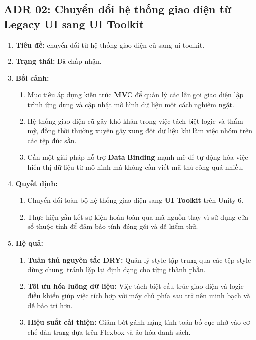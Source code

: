 \subsection{ADR 02: Chuyển đổi hệ thống giao diện từ Legacy UI sang UI Toolkit} \label{adr:02}

\begin{enumerate}
	\item \textbf{Tiêu đề:} chuyển đổi từ hệ thống giao diện cũ sang ui toolkit.
	\item \textbf{Trạng thái:} Đã chấp nhận.
	\item \textbf{Bối cảnh:}
	\begin{enumerate}
		\item Mục tiêu áp dụng kiến trúc \textbf{MVC} để quản lý các lần gọi giao diện lập trình ứng dụng và cập nhật mô hình dữ liệu một cách nghiêm ngặt.
		\item Hệ thống giao diện cũ gây khó khăn trong việc tách biệt logic và thẩm mỹ, đồng thời thường xuyên gây xung đột dữ liệu khi làm việc nhóm trên các tệp đúc sẵn.
		\item Cần một giải pháp hỗ trợ \textbf{Data Binding} mạnh mẽ để tự động hóa việc hiển thị dữ liệu từ mô hình mà không cần viết mã thủ công quá nhiều.
	\end{enumerate}
	\item \textbf{Quyết định:}
	\begin{enumerate}
		\item Chuyển đổi toàn bộ hệ thống giao diện sang \textbf{UI Toolkit} trên Unity 6.
		\item Thực hiện gắn kết sự kiện hoàn toàn qua mã nguồn thay vì sử dụng cửa sổ thuộc tính để đảm bảo tính đóng gói và dễ kiểm thử.
	\end{enumerate}
	\item \textbf{Hệ quả:}
	\begin{enumerate}
		\item \textbf{Tuân thủ nguyên tắc DRY:} Quản lý style tập trung qua các tệp style dùng chung, tránh lặp lại định dạng cho từng thành phần.
		\item \textbf{Tối ưu hóa luồng dữ liệu:} Việc tách biệt cấu trúc giao diện và logic điều khiển giúp việc tích hợp với máy chủ phía sau trở nên minh bạch và dễ bảo trì hơn.
		\item \textbf{Hiệu suất cải thiện:} Giảm bớt gánh nặng tính toán bố cục nhờ vào cơ chế dàn trang dựa trên Flexbox và ảo hóa danh sách.
	\end{enumerate}
\end{enumerate}